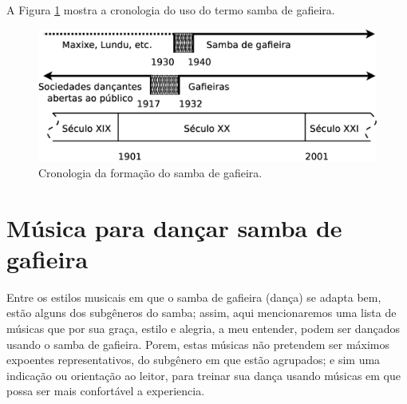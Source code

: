 A Figura \ref{fig:sambagafieiracrono} mostra a cronologia do uso do termo samba de gafieira. 

\begin{figure}[h]
  \centering
    \includegraphics[width=1.0\textwidth]{chapters/cap-historia-sambagafieira/gafieira-crono.eps}
  \caption{ Cronologia da formação do samba de gafieira.}
\label{fig:sambagafieiracrono}
\end{figure}

\section{Música para dançar samba de gafieira}
\label{subsec:gafieiradancaestilos}

Entre os estilos musicais em que o samba de gafieira (dança) se adapta bem, 
estão alguns dos subgêneros do samba; assim,
aqui mencionaremos uma lista de músicas que por sua graça, estilo e alegria,
a meu entender, podem ser dançados usando o samba de gafieira. Porem, 
estas músicas não pretendem ser máximos expoentes representativos, do subgênero em que estão agrupados;
e sim uma indicação ou orientação ao leitor, 
para treinar sua dança usando músicas em que possa ser mais confortável a experiencia.

